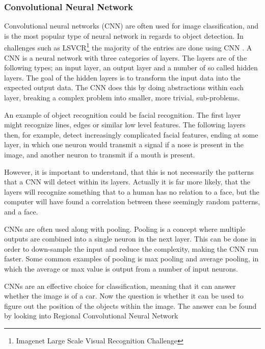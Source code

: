 \subsubsection{Convolutional Neural Network}
\label{sec:cnn}
Convolutional neural networks (CNN) are often used for image classification, and is the most popular type of neural network in regards to object detection.
In challenges such as LSVCR\footnote{Imagenet Large Scale Visual Recognition Challenge} the majority of the entries are done using CNN \cite{ILSVRC_Results}.  
A CNN is a neural network with three categories of layers.
The layers are of the following types; an input layer, an output layer and a number of so called hidden layers.
The goal of the hidden layers is to transform the input data into the expected output data.
The CNN does this by doing abstractions within each layer, breaking a complex problem into smaller, more trivial, sub-problems.

An example of object recognition could be facial recognition.
The first layer might recognize lines, edges or similar low level features.
The following layers then, for example, detect increasingly complicated facial features, ending at some layer, in which one neuron would transmit a signal if a nose is present in the image, and another neuron to transmit if a mouth is present.



However, it is important to understand, that this is not necessarily the patterns that a CNN will detect within its layers.
Actually it is far more likely, that the layers will recognize something that to a human has no relation to a face, but the computer will have found a correlation between these seemingly random patterns, and a face.

CNNs are often used along with pooling.
Pooling is a concept where multiple outputs are combined into a single neuron in the next layer.
This can be done in order to down-sample the input and reduce the complexity, making the CNN run faster.
Some common examples of pooling is max pooling and average pooling, in which the average or max value is output from a number of input neurons.

CNNs are an effective choice for classification, meaning that it can answer whether the image is of a car.
Now the question is whether it can be used to figure out the position of the objects within the image.
The answer can be found by looking into Regional Convolutional Neural Network


